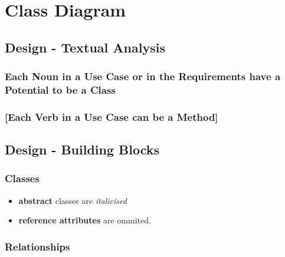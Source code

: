 \documentclass{report}
\begin{document}
\chapter{Class Diagram}


\section{Design - Textual Analysis}

\subsection{Each Noun in a Use Case or in the Requirements have
a Potential to be a Class}

\subsection{[Each Verb in a Use Case can be a Method]}


\section{Design - Building Blocks}

\subsection{Classes}
\begin{itemize}
  \item \textbf{abstract} classes are \textit{italicised}
  \item \textbf{reference attributes} are ommited.
\end{itemize}

\subsection{Relationships}
\end{document}
